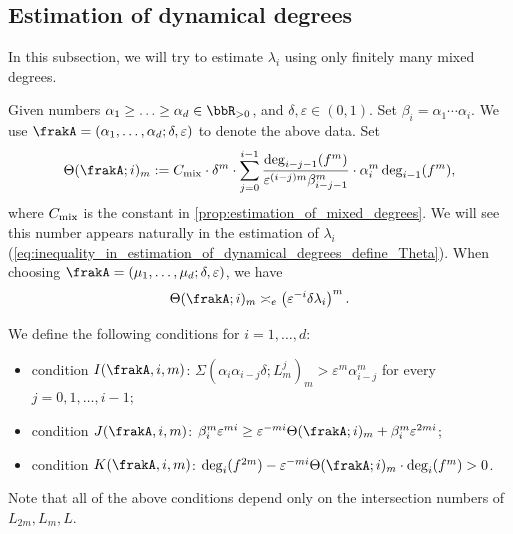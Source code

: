 \subsection{Estimation of dynamical degrees}

  In this subsection, we will try to estimate $\lambda_i$ using only finitely many mixed degrees.


  Given numbers $\alpha_1 \geq \ldots \geq \alpha_{d} \in \bbR_{>0}$, and $\delta, \varepsilon \in (0, 1)$.
  Set $\beta_i = \alpha_1 \cdots \alpha_i$.
  We use $\frakA = (\alpha_1, \ldots, \alpha_d; \delta, \varepsilon)$ to denote the above data.
  Set 
  \[ \Theta(\frakA; i)_m := C_{\mix} \cdot \delta^m \cdot \sum_{j=0}^{i-1} \frac{\deg_{i-j-1}(f^{m})}{\varepsilon^{(i-j)m}\beta_{i-j-1}^m} \cdot \alpha_i^m \deg_{i-1}(f^{m}), \]
  where $C_{\text{mix}}$ is the constant in \cref{prop:estimation_of_mixed_degrees}.
  We will see this number appears naturally in the estimation of $\lambda_i$ (\cref{eq:inequality_in_estimation_of_dynamical_degrees_define_Theta}).
  When choosing $\frakA = (\mu_1, \ldots, \mu_d; \delta, \varepsilon)$, we have 
  \[ \Theta(\frakA; i)_m \asymp_e \left( \varepsilon^{-i} \delta \lambda_i \right)^m. \]

  \begin{definition}
    We define the following conditions for $i = 1, \ldots, d$: 
    \begin{itemize}
      \item condition $I(\frakA,i,m)$: $\Sigma(\alpha_i \alpha_{i-j} \delta; L_m^{j})_{m} > \varepsilon^m \alpha_{i-j}^m$ for every $j = 0, 1, \ldots, i-1$;
      \item condition $J(\frakA,i,m)$: $\beta_i^m \varepsilon^{mi} \geq \varepsilon^{-mi} \Theta(\frakA; i)_m + \beta_i^m \varepsilon^{2mi}$;
      \item condition $K(\frakA,i,m)$: $\deg_i(f^{2m}) - \varepsilon^{-mi}\Theta(\frakA; i)_m \cdot \deg_i(f^{m}) > 0$.
    \end{itemize}
  \end{definition}

  Note that all of the above conditions depend only on the intersection numbers of $L_{2m}, L_m, L$.


